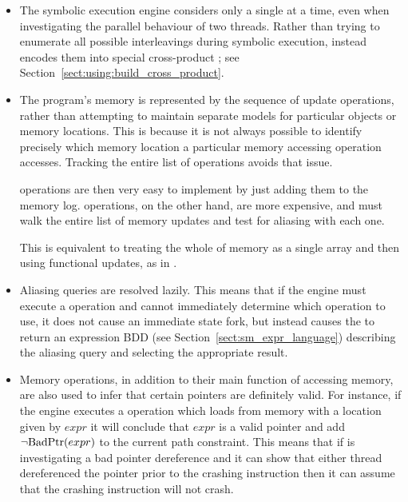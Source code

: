 \begin{itemize}
\item The symbolic execution engine considers only a single
  {\StateMachine} at a time, even when investigating the parallel
  behaviour of two threads.  Rather than trying to enumerate all
  possible interleavings during symbolic execution, {\technique}
  instead encodes them into special cross-product {\StateMachines};
  see Section~\ref{sect:using:build_cross_product}.

\item The program's memory is represented by the sequence of update
  operations, rather than attempting to maintain separate models for
  particular objects or memory locations.  This is because it is not
  always possible to identify precisely which memory location a
  particular memory accessing operation accesses.  Tracking the entire
  list of operations avoids that issue.

   operations are then very easy to implement by just
  adding them to the memory log.   operations, on the
  other hand, are more expensive, and must walk the entire list of
  memory updates and test for aliasing with each one.

  This is equivalent to treating the whole of memory as a single array
  and then using functional updates, as in \needCite{}.  


\item Aliasing queries are resolved lazily.  This means that if the
  engine must execute a  operation and cannot immediately
  determine which  operation to use, it does not cause an
  immediate state fork, but instead causes the  to return
  an expression BDD (see Section~\ref{sect:sm_expr_language})
  describing the aliasing query and selecting the appropriate result.
    

\item Memory operations, in addition to their main function of
  accessing memory, are also used to infer that certain pointers are
  definitely valid.  For instance, if the engine executes a
   operation which loads from memory with a location given
  by $\mathit{expr}$ it will conclude that $\mathit{expr}$ is a valid
  pointer and add ${\neg}\mathrm{BadPtr}(expr)$ to the current path
  constraint.  This means that if {\technique} is investigating a bad
  pointer dereference and it can show that either thread dereferenced
  the pointer prior to the crashing instruction then it can assume
  that the crashing instruction will not crash.


\end{itemize}
